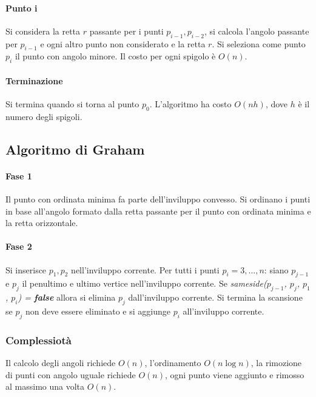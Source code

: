 \paragraph{Punto i}
Si considera la retta $r$ passante per i punti $p_{i-1}, p_{i-2}$, si calcola l'angolo passante per $p_{i-1}$ e ogni altro punto non considerato e la retta $r$. Si  seleziona come punto
$p_i$ il punto con angolo minore. Il costo per ogni spigolo \`e $O(n)$.
\paragraph{Terminazione}
Si termina quando si torna al punto $p_0$. L'algoritmo ha costo $O(nh)$, dove $h$ \`e il numero degli spigoli.
\subsection{Algoritmo di Graham}
\paragraph{Fase 1}
Il punto con ordinata minima fa parte dell'inviluppo convesso. Si ordinano i punti in base all'angolo formato dalla retta passante per il punto con ordinata minima e la retta 
orizzontale.
\paragraph{Fase 2}
Si inserisce $p_1, p_2$ nell'inviluppo corrente. Per tutti i punti $p_i = 3, \dots, n$: siano $p_{j-1}$ e $p_j$ il penultimo e ultimo vertice nell'inviluppo corrente. Se 
\emph{sameside($p_{j-1}$, $p_j$, $p_1$, $p_i$) = \textbf{false}} allora si elimina $p_j$ dall'inviluppo corrente. Si termina la scansione se $p_j$ non deve essere eliminato e si
aggiunge $p_i$ all'inviluppo corrente.

\subsubsection{Complessiot\`a}
Il calcolo degli angoli richiede $O(n)$, l'ordinamento $O(n\log n)$, la rimozione di punti con angolo uguale richiede $O(n)$, ogni punto viene aggiunto e rimosso al massimo una 
volta $O(n)$.
